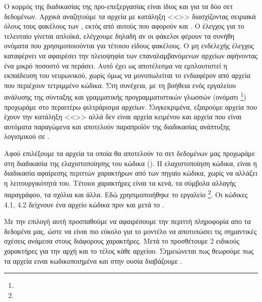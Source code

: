 Ο κορμός της διαδικασίας της προ-επεξεργασίας είναι ίδιος και για τα δύο σετ δεδομένων. 
Αρχικά αναζητούμε τα αρχεία με κατάληξη <<>> διασχίζοντας σειριακά όλους τους φακέλους των , εκτός από αυτούς που αφορούν  και .
Ο έλεγχος για το τελευταίο γίνεται απλοϊκά, ελέγχουμε δηλαδή αν οι φάκελοι φέρουν τα συνήθη ονόματα που χρησιμοποιούνται για τέτοιου είδους φακέλους.
Ο μη ενδελεχής έλεγχος καταφέρνει να αφαιρέσει την πλειοψηφία των επαναλαμβανόμενων αρχείων αφήνοντας ένα μικρό ποσοστό να περάσει.
Αυτό έχει ως αποτέλεσμα να εμπλουτιστεί η εκπαίδευση του νευρωνικού, χωρίς όμως να μονοπωλείται το ενδιαφέρον από αρχεία που περιέχουν τετριμμένο κώδικα.
Στη συνέχεια, με τη βοήθεια ενός εργαλείου ανάλυσης της σύνταξης και γραμματικής προγραμματιστικών γλωσσών (ονόματι \footnote{}) προχωράμε στο περαιτέρω φιλτράρισμα αρχείων.
Συγκεκριμένα, εξαιρούμε αρχεία που έχουν την κατάληξη <<>> αλλά δεν είναι αρχεία κειμένου και αρχεία που είναι αυτόματα παραγώμενα και αποτελούν παραπροϊόν της διαδικασίας ανάπτυξης λογισμικού σε .





Αφού επιλέξουμε τα αρχεία τα οποία θα αποτελούν το σετ δεδομένων μας προχωράμε στη διαδικασία της ελαχιστοποίησης του κώδικα ().
Η ελαχιστοποίηση κώδικα, είναι η διαδικασία αφαίρεσης περιττών χαρακτήρων από των πηγαίο κώδικα, χωρίς να αλλάζει η λειτουργικότητά του. Τέτοιοι χαρακτήρες είναι τα κενά, τα σύμβολα αλλαγής παραγράφου, τα σχόλια και άλλα. Εδώ χρησιμοποιήθηκε το εργαλείο \footnote{}. Οι κώδικες 4.1, 4.2 δείχνουν ένα αρχείο κώδικα πριν και μετά το .

Με την επιλογή αυτή προσπαθούμε να αφαιρέσουμε την περιττή πληροφορία απο τα δεδομένα μας, ώστε να είναι πιο εύκολο για το μοντέλο να αποτυπώσει τις σημαντικές σχέσεις ανάμεσα στους διάφορους χαρακτήρες.
Μετά το  προσθέτουμε 2 ειδικούς χαρακτήρες για την αρχή και το τέλος κάθε αρχείου. Σημειώνεται πως θεωρούμε πως τα αρχεία ειναι  κωδικοποιημένα και στην ουσία διαβάζουμε .

